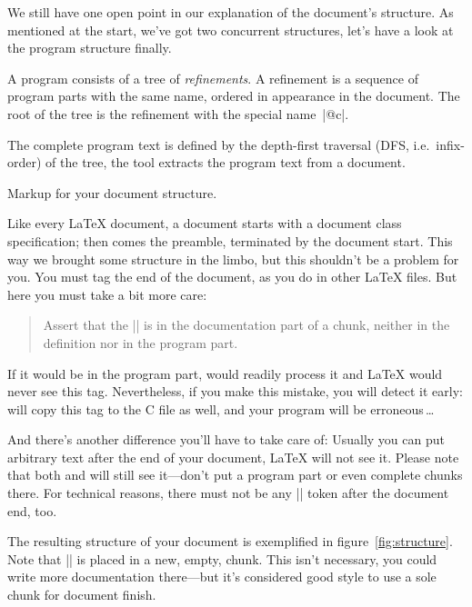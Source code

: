 \sect We still have one open point in our explanation of the
document's structure. As mentioned at the start, we've got two
concurrent structures, let's have a look at the program structure
finally.

A \cweb{} program consists of a tree of \textsl{refinements}. A
refinement is a sequence of program parts with the same name, ordered
in appearance in the document. The root of the tree is the refinement
with the special name~|@c|.

The complete program text is defined by the depth-first traversal
(DFS, i.e.\ infix-order) of the tree, the tool \ctangle{} extracts the
program text from a \cweb{} document.




\chap Markup for your document structure.

Like every \LaTeX{} document, a \cweb{} document starts with a
document class specification; then comes the preamble, terminated by
the document start. This way we brought some structure in the \cweb{}
limbo, but this shouldn't be a problem for you. You must tag the end
of the document, as you do in other \LaTeX{} files. But here you must
take a bit more care:
%
\begin{quote}
  \itshape

  Assert that the\/ || is in the documentation part of
  a\/ chunk, neither in the definition nor in the program part.

\end{quote}
%
If it would be in the program part, \cweave{} would readily process it
and \LaTeX{} would never see this tag. Nevertheless, if you make this
mistake, you will detect it early: \ctangle{} will copy this tag to
the C file as well, and your program will be erroneous\,\dots

And there's another difference you'll have to take care of: Usually
you can put arbitrary text after the end of your document, \LaTeX{}
will not see it. Please note that both \ctangle{} and \cweave{} will
still see it---don't put a program part or even complete chunks there.
For technical reasons, there must not be any |\fi| token after the
document end, too.


\sect The resulting structure of your \cweb{} document is exemplified
in figure~\ref{fig:structure}. Note that || is placed
in a new, empty, chunk. This isn't necessary, you could write more
documentation there---but it's considered good style to use a sole
chunk for document finish.

